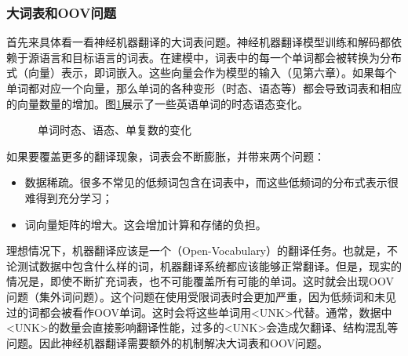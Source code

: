 
\subsubsection{大词表和OOV问题}

\parinterval 首先来具体看一看神经机器翻译的大词表问题。神经机器翻译模型训练和解码都依赖于源语言和目标语言的词表。在建模中，词表中的每一个单词都会被转换为分布式（向量）表示，即词嵌入。这些向量会作为模型的输入（见第六章）。如果每个单词都对应一个向量，那么单词的各种变形（时态、语态等）都会导致词表和相应的向量数量的增加。图\ref{fig:7-7}展示了一些英语单词的时态语态变化。

\begin{figure}[htp]
\centering

\caption{单词时态、语态、单复数的变化}
\label{fig:7-7}
\end{figure}

\parinterval 如果要覆盖更多的翻译现象，词表会不断膨胀，并带来两个问题：

\begin{itemize}
\item 数据稀疏。很多不常见的低频词包含在词表中，而这些低频词的分布式表示很难得到充分学习；

\item 词向量矩阵的增大。这会增加计算和存储的负担。
\end{itemize}

\parinterval 理想情况下，机器翻译应该是一个{\small{}}（Open-Vocabulary）的翻译任务。也就是，不论测试数据中包含什么样的词，机器翻译系统都应该能够正常翻译。但是，现实的情况是，即使不断扩充词表，也不可能覆盖所有可能的单词。这时就会出现OOV问题（集外词问题）。这个问题在使用受限词表时会更加严重，因为低频词和未见过的词都会被看作OOV单词。这时会将这些单词用<UNK>代替。通常，数据中<UNK>的数量会直接影响翻译性能，过多的<UNK>会造成欠翻译、结构混乱等问题。因此神经机器翻译需要额外的机制解决大词表和OOV问题。



